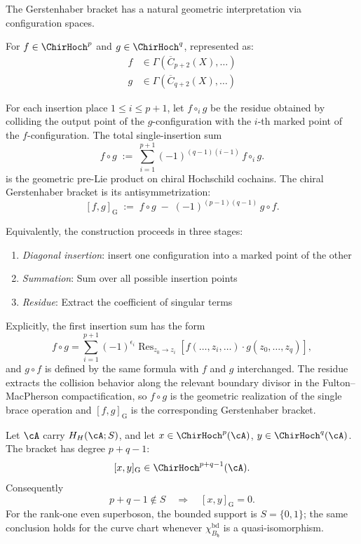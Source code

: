\begin{construction}\label{const:gerstenhaber-bracket}
The Gerstenhaber bracket has a natural geometric interpretation via configuration spaces.

For $f \in \ChirHoch^p$ and $g \in \ChirHoch^q$, represented as:
\begin{align*}
f &\in \Gamma(\overline{C}_{p+2}(X), \ldots)\\
g &\in \Gamma(\overline{C}_{q+2}(X), \ldots)
\end{align*}

For each insertion place $1 \leq i \leq p+1$, let
$f \circ_i g$ be the residue obtained by colliding the
output point of the $g$-configuration with the $i$-th marked
point of the $f$-configuration. The total single-insertion
sum
\[
f \circ g
\;:=\;
\sum_{i=1}^{p+1} (-1)^{(q-1)(i-1)}\, f \circ_i g.
\]
is the geometric pre-Lie product on chiral Hochschild cochains.
The chiral Gerstenhaber bracket is its antisymmetrization:
\[
[f,g]_{\mathrm G}
\;:=\;
f \circ g
\;-\;
(-1)^{(p-1)(q-1)}\, g \circ f.
\]

Equivalently, the construction proceeds in three stages:
\begin{enumerate}
\item \emph{Diagonal insertion}: insert one configuration into a marked point of the other
\item \emph{Summation}: Sum over all possible insertion points
\item \emph{Residue}: Extract the coefficient of singular terms
\end{enumerate}

Explicitly, the first insertion sum has the form
\[
f \circ g
=
\sum_{i=1}^{p+1} (-1)^{\epsilon_i}
\operatorname{Res}_{z_0 \to z_i}
\left[
f(\ldots, z_i, \ldots)\cdot
g(z_0, \ldots, z_q)
\right],
\]
and $g \circ f$ is defined by the same formula with $f$ and $g$
interchanged. The residue extracts the collision behavior along the
relevant boundary divisor in the Fulton--MacPherson compactification,
so $f \circ g$ is the geometric realization of the single brace
operation and $[f,g]_{\mathrm G}$ is the corresponding
Gerstenhaber bracket.
\end{construction}

\begin{example}
\label{ex:gerstenhaber-heisenberg}
Let \(\cA\) carry \(H_H(\cA;S)\), and let
\(x\in\ChirHoch^p(\cA)\), \(y\in\ChirHoch^q(\cA)\).  The bracket has
degree \(p+q-1\):
\[
 [x,y]_{\mathrm G}\in\ChirHoch^{p+q-1}(\cA).
\]
Consequently
\[
 p+q-1\notin S
 \quad\Longrightarrow\quad
 [x,y]_{\mathrm G}=0.
\]
For the rank-one even superboson, the bounded support is
\(S=\{0,1\}\); the same conclusion holds for the curve chart whenever
\(\chi_{B_{\mathfrak h}}^{\mathrm{bd}}\) is a quasi-isomorphism.
\end{example}

